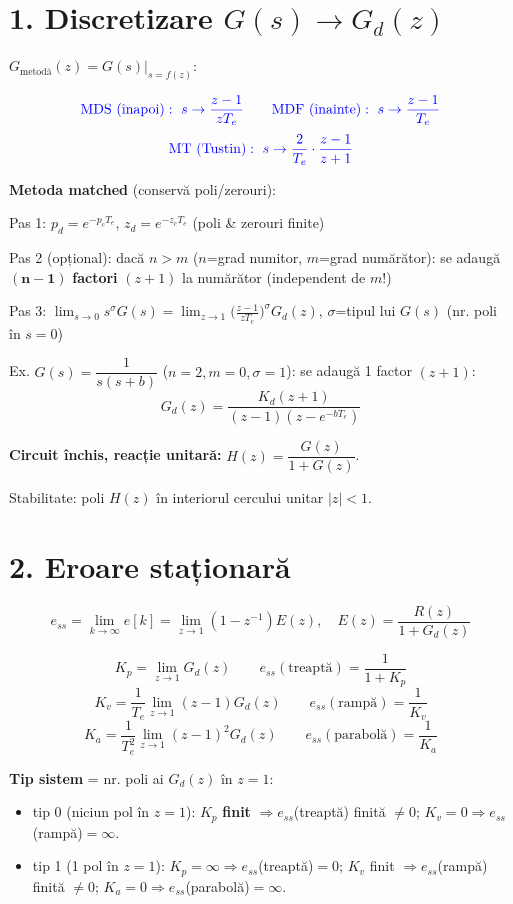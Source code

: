 \documentclass[8.2pt,a4paper,twocolumn]{extarticle}
\begin{document}

\section*{1. Discretizare $G(s)\to G_d(z)$}
$G_{\text{metodă}}(z)=G(s)\big|_{s=f(z)}$:
\begin{res}
$$\color{blue}\text{MDS (înapoi)}:\ s\to\frac{z-1}{zT_e}\qquad
\text{MDF (înainte)}:\ s\to\frac{z-1}{T_e}$$
$$\color{blue}\text{MT (Tustin)}:\ s\to\frac2{T_e}\cdot\frac{z-1}{z+1}$$
\end{res}

\textbf{Metoda matched} (conservă poli/zerouri):
\begin{res}
Pas 1: $p_d=e^{-p_cT_e}$, $z_d=e^{-z_cT_e}$ (poli \& zerouri finite)

Pas 2 (opțional): dacă $n>m$ ($n$=grad numitor, $m$=grad numărător): se adaugă $\boldsymbol{(n-1)}$ \textbf{factori} $(z+1)$ la numărător (independent de $m$!)

Pas 3: $\displaystyle\lim_{s\to0}s^\sigma G(s)=\lim_{z\to1}\Big(\frac{z-1}{zT_e}\Big)^{\!\sigma}\!G_d(z)$, $\sigma$=tipul lui $G(s)$ (nr. poli în $s=0$)
\end{res}
Ex. $G(s)=\dfrac1{s(s+b)}$ ($n=2,m=0,\sigma=1$): se adaugă 1 factor $(z+1)$:
$$G_d(z)=\frac{K_d(z+1)}{(z-1)(z-e^{-bT_e})}$$

\textbf{Circuit închis, reacție unitară:} $H(z)=\dfrac{G(z)}{1+G(z)}$.

Stabilitate: poli $H(z)$ în interiorul cercului unitar $|z|<1$.

\section*{2. Eroare staționară}
$$e_{ss}=\lim_{k\to\infty}e[k]=\lim_{z\to1}(1-z^{-1})E(z),\quad E(z)=\frac{R(z)}{1+G_d(z)}$$
\begin{res}
$$K_p=\lim_{z\to1}G_d(z)\qquad e_{ss}(\text{treaptă})=\frac1{1+K_p}$$
$$K_v=\frac1{T_e}\lim_{z\to1}(z-1)G_d(z)\qquad e_{ss}(\text{rampă})=\frac1{K_v}$$
$$K_a=\frac1{T_e^2}\lim_{z\to1}(z-1)^2G_d(z)\qquad e_{ss}(\text{parabolă})=\frac1{K_a}$$
\end{res}
\textbf{Tip sistem} = nr. poli ai $G_d(z)$ în $z=1$:
\begin{itemize}
\item tip 0 (niciun pol în $z=1$): $K_p$ \textbf{finit} $\Rightarrow e_{ss}$(treaptă) finită $\ne0$; $K_v=0\Rightarrow e_{ss}$(rampă)$=\infty$.
\item tip 1 (1 pol în $z=1$): $K_p=\infty\Rightarrow e_{ss}$(treaptă)$=0$; $K_v$ finit $\Rightarrow e_{ss}$(rampă) finită $\ne0$; $K_a=0\Rightarrow e_{ss}$(parabolă)$=\infty$.
\end{itemize}
\end{document}
